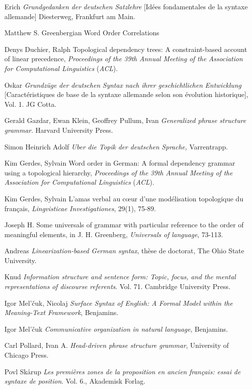 {    Erich \citet{Drach1937} \textit{Grundgedanken der deutschen Satzlehre} [Idées fondamentales de la syntaxe allemande] Diesterweg, Frankfurt am Main.

    Matthew S. \citet{Dryer1992}  Greenbergian Word Order Correlations

    Denys Duchier, Ralph \citet{Debusmann2001} Topological dependency trees: A constraint-based account of linear precedence, \textit{Proceedings of the 39th Annual Meeting of the Association for Computational Linguistics} (\textit{ACL}).

    Oskar \citet{Erdmann1886} \textit{Grundzüge der deutschen Syntax nach ihrer geschichtlichen Entwicklung} [Caractéristiques de base de la syntaxe allemande selon son évolution historique], Vol. 1. JG Cotta.

    Gerald Gazdar, Ewan Klein, Geoffrey Pullum, Ivan \citet{Sag1985} \textit{Generalized phrase structure grammar}. Harvard University Press.

    Simon Heinrich Adolf \citet{Herling1821} \textit{Uber die Topik der deutschen Sprache,} Varrentrapp.

    Kim Gerdes, Sylvain \citet{Kahane2001} Word order in German: A formal dependency grammar using a topological hierarchy, \textit{Proceedings of the 39th Annual Meeting of the Association for Computational Linguistics} (\textit{ACL}).

    Kim Gerdes, Sylvain \citet{Kahane2006} L’amas verbal au cœur d’une modélisation topologique du français, \textit{Lingvisticae Investigationes}, 29(1), 75-89.

    Joseph H. \citet{Greenberg1963} Some universals of grammar with particular reference to the order of meaningful elements, in J. H. Greenberg, \textit{Universals of language}, 73-113.

    Andreas \citet{Kathol1995} \textit{Linearization-based German syntax}, thèse de doctorat, The Ohio State University.

    Knud \citet{Lambrecht1996} \textit{Information structure and sentence form: Topic, focus, and the mental representations of discourse referents}. Vol. 71. Cambridge University Press.

    Igor Mel’čuk, Nicolaj \citet{Pertsov1987} \textit{Surface Syntax of English: A Formal Model within the Meaning-Text Framework}, Benjamins.

    Igor Mel’čuk  \textit{Communicative organization in natural language}, Benjamins.

    Carl Pollard, Ivan A. \citet{Sag1994} \textit{Head-driven phrase structure grammar}, University of Chicago Press.

    Povl Skårup  \textit{Les premières zones de la proposition en ancien français: essai de syntaxe de position}. Vol. 6., Akademisk Forlag.
}

